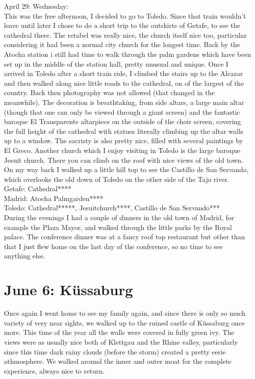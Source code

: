 April 29: Wednesday:\\
This was the free afternoon, I decided to go to Toledo. Since that train wouldn't leave until later I chose to do a short trip to the outskirts of Getafe, to see the cathedral there. The retabel was really nice, the church itself nice too, particular considering it had been a normal city church for the longest time. Back by the Atocha station i still had time to walk through the palm gardens which have been set up in the middle of the station hall, pretty unusual and unique. Once I arrived in Toledo after a short train ride, I climbed the stairs up to the Alcazar and then walked along nice little roads to the cathedral, on of the largest of the country. Back then photography was not allowed (that changed in the meanwhile). The decoration is breathtaking, from side altars, a large main altar (though that one can only be viewed through a giant screen) and the fantastic baroque El Transparente altarpiece on the outside of the choir screen, covering the full height of the cathedral with statues literally climbing up the altar walls up to a window. The sacristy is also pretty nice, filled with several paintings by El Greco. Another church which I enjoy visiting in Toledo is the large baroque Jesuit church. There you can climb on the roof with nice views of the old town. On my way back I walked up a little hill top to see the Castillo de San Servando, which overlooks the old down of Toledo on the other side of the Tajo river.\\

Getafe: Cathedral****\\
Madrid: Atocha Palmgarden****\\
Toledo: Cathedral*****, Jesuitchurch****, Castillo de San Servando***\\

During the evenings I had a couple of dinners in the old town of Madrid, for example the Plaza Mayor, and walked through the little parks by the Royal palace. The conference dinner was at a fancy roof top restaurant but other than that I just flew home on the last day of the conference, so no time to see anything else.

\section{June 6: K\"ussaburg}
\label{2009:Kuessaburg}

Once again I went home to see my family again, and since there is only so much variety of very near sights, we walked up to the ruined castle of K\"ussaburg once more. This time of the year all the walls were covered in fully green ivy. The views were as usually nice both of Klettgau and the Rhine valley, particularly since this time dark rainy clouds (before the storm) created a pretty eerie athmosphere. We walked around the inner and outer moat for the complete experience, always nice to return.\\

